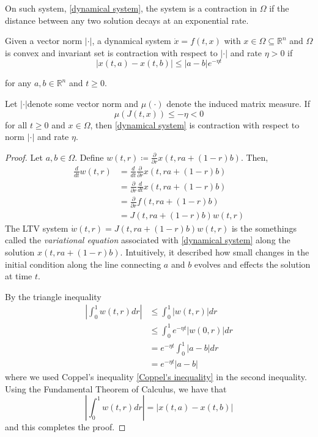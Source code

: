 \documentclass[12pt,English]{article}
\begin{document}
On such system, \ref{dynamical system}, the system is a contraction in $\Omega$ if the distance between any two solution decays at an exponential rate.
\begin{defn}
Given a vector norm $\left|\cdot\right|$, a dynamical system $\dot{x}=f\left(t,x\right)$ with $x\in\Omega\subseteq\mathbb{R}^{n}$ and $\Omega$ is convex and invariant set is contraction with respect to $\left|\cdot\right|$ and rate $\eta>0$ if 
\begin{equation}\label{contraction definition}
    \left|x\left(t,a\right)-x\left(t,b\right)\right|\leq\left|a-b\right|e^{-\eta t}
\end{equation}

for any $a,b\in\mathbb{R}^{n}$ and $t\geq0.$
\end{defn}
%
\begin{thm}
Let $\left|\cdot\right|$denote some vector norm and $\mu\left(\cdot\right)$ denote the induced matrix measure. If
\[
\mu\left(J\left(t,x\right)\right)\leq-\eta<0
\]
for all $t\geq0$ and $x\in\Omega$, then \ref{dynamical system} is contraction with respect to norm $\left|\cdot\right|$ and rate $\eta$.
\end{thm}
\begin{proof}
Let $a,b\in\Omega.$ Define $w\left(t,r\right)\coloneqq\frac{\partial}{\partial r}x\left(t,ra+\left(1-r\right)b\right).$ Then, 
\begin{align*}
\frac{d}{dt}w\left(t,r\right) & =\frac{d}{dt}\frac{\partial}{\partial r}x\left(t,ra+\left(1-r\right)b\right)\\
 & =\frac{\partial}{\partial r}\frac{d}{dt}x\left(t,ra+\left(1-r\right)b\right)\\
 & =\frac{\partial}{\partial r}f\left(t,ra+\left(1-r\right)b\right)\\
 & =J\left(t,ra+\left(1-r\right)b\right)w\left(t,r\right)
\end{align*}
The LTV system $\dot{w}\left(t,r\right)=J\left(t,ra+\left(1-r\right)b\right)w\left(t,r\right)$ is the somethings called the \textit{variational equation} associated with \ref{dynamical system} along the solution $x\left(t,ra+\left(1-r\right)b\right).$ Intuitively, it described how small changes in the initial condition along the line connecting $a$ and $b$ evolves and effects the solution at time $t$. 

By the triangle inequality 
\begin{align*}
\left|\int_{0}^{1}w\left(t,r\right)dr\right| & \leq\int_{0}^{1}\left|w\left(t,r\right)\right|dr\\
 & \leq\int_{0}^{1}e^{-\eta t}\left|w\left(0,r\right)\right|dr\\
 & =e^{-\eta t}\int_{0}^{1}\left|a-b\right|dr\\
 & =e^{-\eta t}\left|a-b\right|
\end{align*}
where we used Coppel's inequality  \ref{Coppel's inequality} in the second inequality. Using the Fundamental Theorem of Calculus, we have that
\[
\left|\int_{0}^{1}w\left(t,r\right)dr\right|=\left|x\left(t,a\right)-x\left(t,b\right)\right|
\]
and this completes the proof.
\end{proof}
\end{document}
